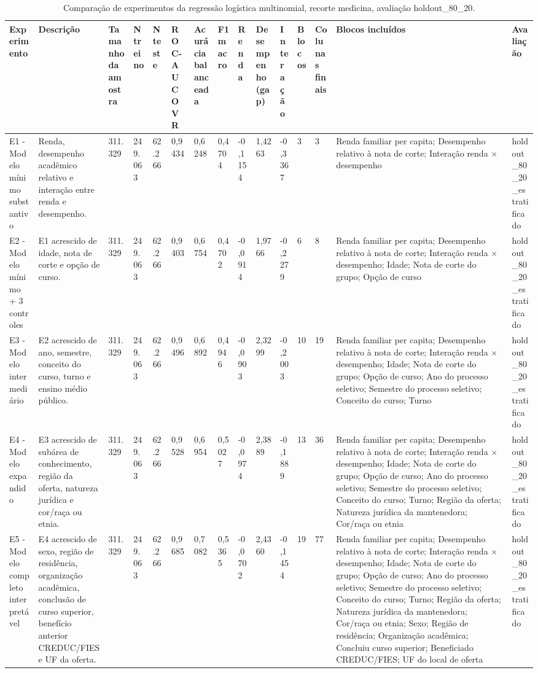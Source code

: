 \begin{table}
\caption{Comparação de experimentos da regressão logística multinomial, recorte medicina, avaliação holdout_80_20.}
\label{tab:tabela_logit_ternario_recorte_medicina_holdout_80_20}
\begin{tabular}{lllllllllllllll}
\toprule
Experimento & Descrição & Tamanho da amostra & N treino & N teste & ROC-AUC OVR & Acurácia balanceada & F1 macro & Renda & Desempenho (gap) & Interação & Blocos & Colunas finais & Blocos incluídos & Avaliação \\
\midrule
E1 - Modelo mínimo substantivo & Renda, desempenho acadêmico relativo e interação entre renda e desempenho. & 311.329 & 249.063 & 62.266 & 0,9434 & 0,6248 & 0,4704 & -0,1154 & 1,4263 & -0,3367 & 3 & 3 & Renda familiar per capita; Desempenho relativo à nota de corte; Interação renda × desempenho & holdout\_80\_20\_estratificado \\
E2 - Modelo mínimo + 3 controles & E1 acrescido de idade, nota de corte e opção de curso. & 311.329 & 249.063 & 62.266 & 0,9403 & 0,6754 & 0,4702 & -0,0914 & 1,9766 & -0,2279 & 6 & 8 & Renda familiar per capita; Desempenho relativo à nota de corte; Interação renda × desempenho; Idade; Nota de corte do grupo; Opção de curso & holdout\_80\_20\_estratificado \\
E3 - Modelo intermediário & E2 acrescido de ano, semestre, conceito do curso, turno e ensino médio público. & 311.329 & 249.063 & 62.266 & 0,9496 & 0,6892 & 0,4946 & -0,0903 & 2,3299 & -0,2003 & 10 & 19 & Renda familiar per capita; Desempenho relativo à nota de corte; Interação renda × desempenho; Idade; Nota de corte do grupo; Opção de curso; Ano do processo seletivo; Semestre do processo seletivo; Conceito do curso; Turno & holdout\_80\_20\_estratificado \\
E4 - Modelo expandido & E3 acrescido de subárea de conhecimento, região da oferta, natureza jurídica e cor/raça ou etnia. & 311.329 & 249.063 & 62.266 & 0,9528 & 0,6954 & 0,5027 & -0,0974 & 2,3889 & -0,1889 & 13 & 36 & Renda familiar per capita; Desempenho relativo à nota de corte; Interação renda × desempenho; Idade; Nota de corte do grupo; Opção de curso; Ano do processo seletivo; Semestre do processo seletivo; Conceito do curso; Turno; Região da oferta; Natureza jurídica da mantenedora; Cor/raça ou etnia & holdout\_80\_20\_estratificado \\
E5 - Modelo completo interpretável & E4 acrescido de sexo, região de residência, organização acadêmica, conclusão de curso superior, benefício anterior CREDUC/FIES e UF da oferta. & 311.329 & 249.063 & 62.266 & 0,9685 & 0,7082 & 0,5365 & -0,0702 & 2,4360 & -0,1454 & 19 & 77 & Renda familiar per capita; Desempenho relativo à nota de corte; Interação renda × desempenho; Idade; Nota de corte do grupo; Opção de curso; Ano do processo seletivo; Semestre do processo seletivo; Conceito do curso; Turno; Região da oferta; Natureza jurídica da mantenedora; Cor/raça ou etnia; Sexo; Região de residência; Organização acadêmica; Concluiu curso superior; Beneficiado CREDUC/FIES; UF do local de oferta & holdout\_80\_20\_estratificado \\
\bottomrule
\end{tabular}
\end{table}
